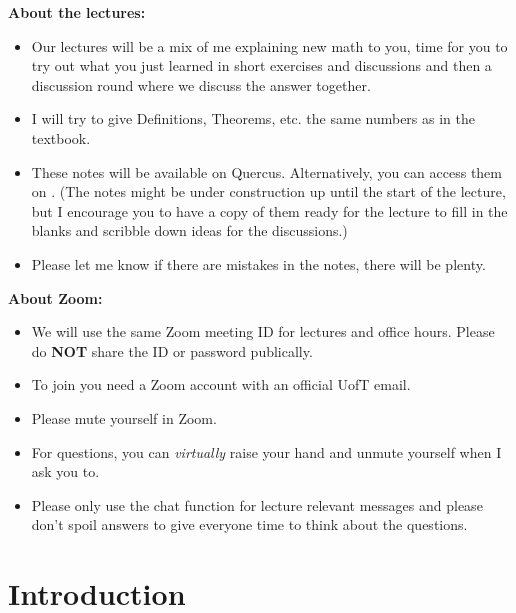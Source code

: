 \documentclass[letterpaper, 10pt]{article}
\begin{document}
\lb
\textbf{About the lectures:}
\begin{itemize}
    \item
        Our lectures will be a mix of me explaining new math to you, time for you to try out
        what you just learned in short exercises and discussions and then a discussion round
        where we discuss the answer together.
    \item
        I will try to give Definitions, Theorems, etc. the same numbers as in the textbook.
    \item
        These notes will be available on Quercus.
        Alternatively, you can access them on 
        \pr
        \href{https://www.github.com/researchnix/mat224}
        {}.
        \pr
        (The notes might be under construction up until the start of the lecture, but I
        encourage you to have a copy of them ready for the lecture to fill in
        the blanks and scribble down ideas for the discussions.)
    \item
        Please let me know if there are mistakes in the notes, there will be plenty.
\end{itemize}

\lb
\textbf{About Zoom:}
\begin{itemize}
    \item We will use the same Zoom meeting ID for lectures and office hours.
            Please do \textbf{NOT} share the ID or password publically.
    \item To join you need a Zoom account with an official UofT email.
    \item Please mute yourself in Zoom.
    \item For questions, you can \emph{virtually} raise your hand and unmute yourself when
        I ask you to.
    \item Please only use the chat function for lecture relevant messages and please don't spoil
        answers to give everyone time to think about the questions.
\end{itemize}


\newpage
\section*{Introduction}%
\label{sec:introduction}
\end{document}
